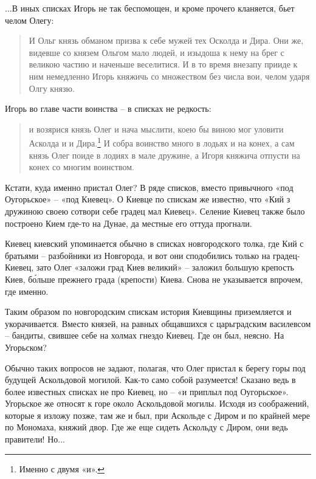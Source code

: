 ...В иных списках Игорь не так беспомощен, и кроме прочего кланяется, бьет челом Олегу:

\begin{quotation}
И Ольг князь обманом призва к себе мужей тех Осколда и Дира. Они же, видевше со князем Ольгом мало людей, и изыдоша к нему на брег с великою частию и наченьше веселитися. И в то время внезапу прииде к ним немедленно Игорь княжичь со множеством без числа вои, челом ударя Олгу князю.
\end{quotation}

Игорь во главе части воинства – в списках не редкость:

\begin{quotation}
и возярися князь Олег и нача мыслити, коею бы виною мог уловити Асколда и и Дира.\footnote{Именно с двумя «и».} И собра воинство много в лодьях и на конех, а сам князь Олег поиде в лодиях в мале дружине, а Игоря княжича отпусти на конех со многим воинством.
\end{quotation}

Кстати, куда именно пристал Олег? В ряде списков, вместо привычного «под Оугорьское» – «под Киевец». О Киевце по спискам же известно, что «Кий з дружиною своею сотвори себе градец мал Киевец». Селение Киевец также было построено Кием где-то на Дунае, да местные его оттуда прогнали.


Киевец киевский упоминается обычно в списках новгородского толка, где Кий с братьями – разбойники из Новгорода, и вот они сподобились только на градец-Киевец, зато Олег «заложи град Киев великий» – заложил большую крепость Киев, б\'ольше прежнего града (крепости) Киева. Снова не указывается впрочем, где именно.

Таким образом по новгородским спискам история Киевщины приземляется и укорачивается. Вместо князей, на равных общавшихся с царьградским василевсом – бандиты, свившее себе на холмах гнездо Киевец. Где он был, неясно. На Угорьском?

Обычно таких вопросов не задают, полагая, что Олег пристал к берегу горы под будущей Аскольдовой могилой. Как-то само собой разумеется! Сказано ведь в более известных списках не про Киевец, но – «и приплыл под Оугорьское». Угорьское же относят к горе около Аскольдовой могилы. Исходя из соображений, которые я изложу позже, там же и был, при Аскольде с Диром и по крайней мере по Мономаха, княжий двор. Где же еще сидеть Аскольду с Диром, они ведь правители! Но...

